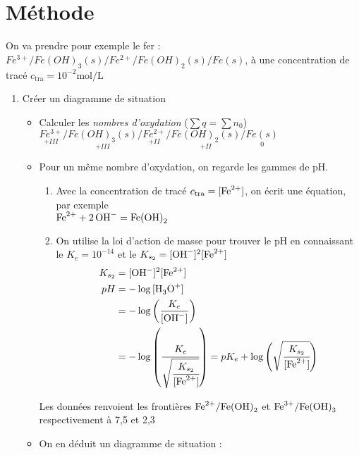 \documentclass[11pt,a4paper,fleqn,pdftex]{report}
\begin{document}
\section{Méthode} %
On va prendre pour exemple le fer : $Fe^{3+}/Fe(OH)_3 (s)/Fe^{2+}/Fe(OH)_2 (s)/Fe (s)$, à une concentration de tracé $c_\text{tra} = 10^{-2} \si{\mole\per\liter}$ 
\begin{enumerate}
	\item	Créer un diagramme de situation
	\begin{itemize}	
		\item Calculer les \emph{nombres d'oxydation} ($\sum q = \sum n_0$) \hfill \\
		$\underset{+III}{Fe^{3+}}/\underset{+III}{Fe(OH)_3 (s)}/\underset{+II}{Fe^{2+}}/\underset{+II}{Fe(OH)_2 (s)}/\underset{0}{Fe (s)}$
		\item Pour un même nombre d'oxydation, on regarde les gammes de pH. 
        \begin{enumerate}
          \item Avec la concentration de tracé $c_{\text{tra}} = [\ce{Fe^2+}]$, on écrit une équation, par exemple \\
          $\ce{Fe^2+ + 2OH- = Fe(OH)2}$
          \item On utilise la loi d'action de masse pour trouver le pH en connaissant le $K_e = 10^{-14}$ et le $K_{s_2}=[\ce{OH-}]^2[\ce{Fe^2+}] $\\
                \begin{align*}
                  K_{s_2} &= [\ce{OH-}]^2[\ce{Fe^2+}]\\
                  pH      &= -\log{[\ce{H3O+}]}\\
                          &= -\log \left( \dfrac{K_e}{[\ce{OH-}]} \right) \\
                          &= -\log \left( \cfrac{K_e}{\sqrt{\cfrac{K_{s_2}}{[\ce{Fe^2+}]}}} \right) = pK_e +\log \left( \sqrt{\cfrac{K_{s_2}}{[\ce{Fe^2+}]}} \right)
                \end{align*}
        \end{enumerate}
        Les données renvoient les frontières $\ce{Fe^2+}/\ce{Fe(OH)2}$ et $\ce{Fe^3+}/\ce{Fe(OH)3}$ respectivement à 7,5 et 2,3
    \item On en déduit un diagramme de situation : \\
\end{itemize}
\end{enumerate}
\end{document}
